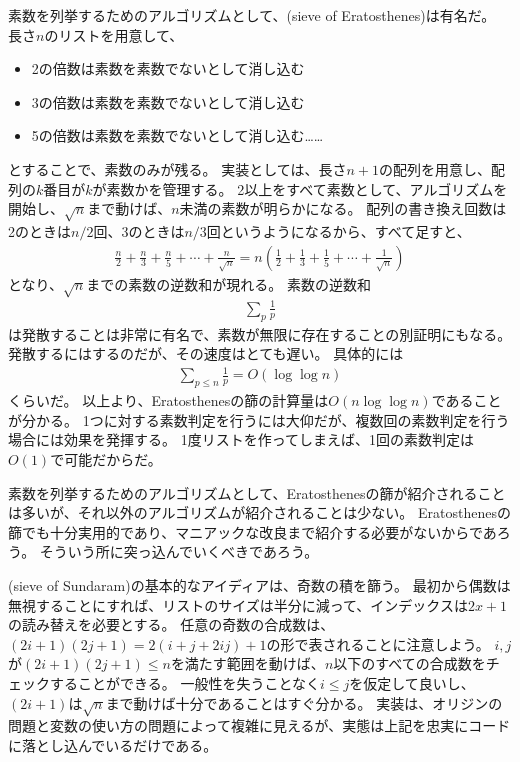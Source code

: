 素数を列挙するためのアルゴリズムとして、(sieve of Eratosthenes)は有名だ。
長さ$n$のリストを用意して、
\begin{itemize}
 \item 2の倍数は素数を素数でないとして消し込む
 \item 3の倍数は素数を素数でないとして消し込む
 \item 5の倍数は素数を素数でないとして消し込む……
\end{itemize}
とすることで、素数のみが残る。
実装としては、長さ$n+1$の配列を用意し、配列の$k$番目が$k$が素数かを管理する。
2以上をすべて素数として、アルゴリズムを開始し、$\sqrt{n}$まで動けば、$n$未満の素数が明らかになる。
配列の書き換え回数は2のときは$n/2$回、3のときは$n/3$回というようになるから、すべて足すと、
\begin{align*}
\frac{n}{2} + \frac{n}{3} + \frac{n}{5} + \cdots + \frac{n}{\sqrt{n}} = n\left(\frac{1}{2}+\frac{1}{3}+\frac{1}{5}+\cdots+\frac{1}{\sqrt{n}}\right)
\end{align*}
となり、$\sqrt{n}$までの素数の逆数和が現れる。
素数の逆数和
\begin{align*}
\sum_p \frac{1}{p}
\end{align*}
は発散することは非常に有名で、素数が無限に存在することの別証明にもなる。
発散するにはするのだが、その速度はとても遅い。
具体的には
\begin{align*}
\sum_{p\le n}\frac{1}{p} = O(\log{\log{n}})
\end{align*}
くらいだ。
以上より、Eratosthenesの篩の計算量は$O(n\log{\log{n}})$であることが分かる。
1つに対する素数判定を行うには大仰だが、複数回の素数判定を行う場合には効果を発揮する。
1度リストを作ってしまえば、1回の素数判定は$O(1)$で可能だからだ。


素数を列挙するためのアルゴリズムとして、Eratosthenesの篩が紹介されることは多いが、それ以外のアルゴリズムが紹介されることは少ない。
Eratosthenesの篩でも十分実用的であり、マニアックな改良まで紹介する必要がないからであろう。
そういう所に突っ込んでいくべきであろう。

(sieve of Sundaram)の基本的なアイディアは、奇数の積を篩う。
最初から偶数は無視することにすれば、リストのサイズは半分に減って、インデックスは$2x+1$の読み替えを必要とする。
任意の奇数の合成数は、$(2i+1)(2j+1)=2(i+j+2ij)+1$の形で表されることに注意しよう。
$i,j$が$(2i+1)(2j+1)\le n$を満たす範囲を動けば、$n$以下のすべての合成数をチェックすることができる。
一般性を失うことなく$i\le j$を仮定して良いし、$(2i+1)$は$\sqrt{n}$まで動けば十分であることはすぐ分かる。
実装は、オリジンの問題と変数の使い方の問題によって複雑に見えるが、実態は上記を忠実にコードに落とし込んでいるだけである。

